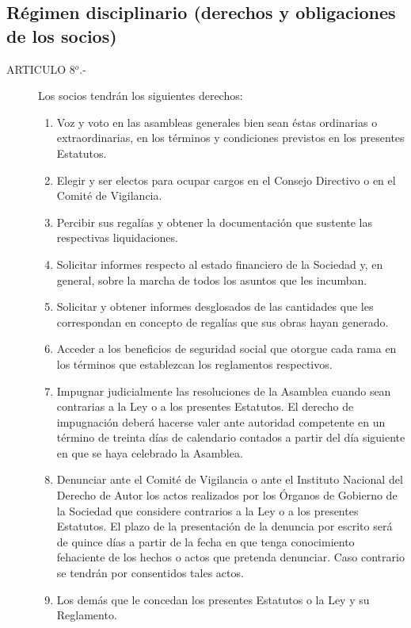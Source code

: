 \documentclass[11pt,letterpaper]{report}
\begin{document}
\subsection{ R\'egimen disciplinario (derechos y obligaciones de los socios) }
\begin{description}
\item[ARTICULO 8$^{o}$.-] Los socios tendr\'an los siguientes derechos:\\ 
\begin{enumerate}
\item Voz y voto en las asambleas generales bien sean \'estas ordinarias o extraordinarias, en los t\'erminos y condiciones previstos en los presentes Estatutos.
\item Elegir y ser electos para ocupar cargos en el Consejo Directivo o en el Comit\'e de Vigilancia.
\item Percibir sus regal\'ias y obtener la documentaci\'on que sustente las respectivas liquidaciones.
\item Solicitar informes respecto al estado financiero de la Sociedad y, en general, sobre la marcha de todos los asuntos que les incumban.
\item Solicitar y obtener informes desglosados de las cantidades que les correspondan en concepto de regal\'ias que sus obras hayan generado.
\item Acceder a los beneficios de seguridad social que otorgue cada rama en los t\'erminos que establezcan los reglamentos respectivos.
\item Impugnar judicialmente las resoluciones de la Asamblea cuando sean contrarias a la Ley o a los presentes Estatutos. El derecho de impugnaci\'on deber\'a hacerse valer ante autoridad competente en un t\'ermino de treinta d\'ias de calendario contados a partir del d\'ia siguiente en que se haya celebrado la Asamblea.
\item Denunciar ante el Comit\'e de Vigilancia o ante el Instituto Nacional del Derecho de Autor los actos realizados por los \'Organos de Gobierno de la Sociedad que considere contrarios a la Ley o a los presentes Estatutos. El plazo de la presentaci\'on de la denuncia por escrito ser\'a de quince d\'ias a partir de la fecha en que tenga conocimiento fehaciente de los hechos o actos que pretenda denunciar. Caso contrario se tendr\'an por consentidos tales actos.
\item Los dem\'as que le concedan los presentes Estatutos o la Ley y su Reglamento.
\end{enumerate}


\end{description}
\end{document}
